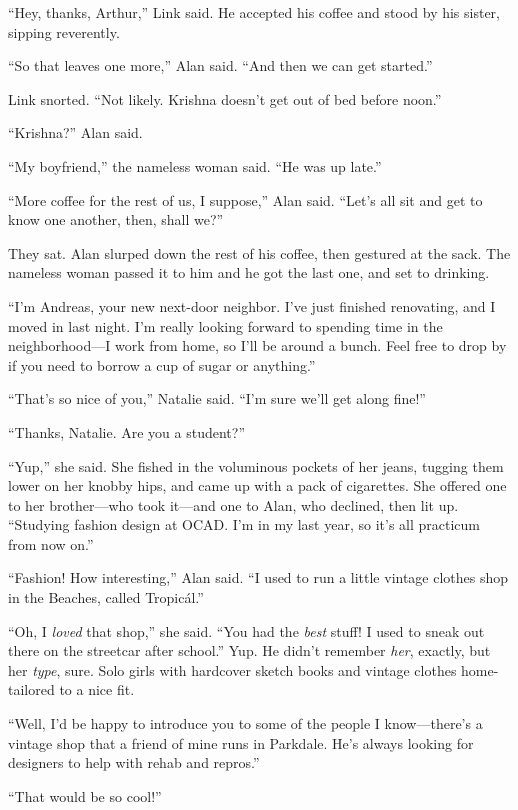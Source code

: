 \documentclass{article}
\begin{document}
``Hey, thanks, Arthur,'' Link said.  He accepted his coffee and stood
by his sister, sipping reverently.

``So that leaves one more,'' Alan said.  ``And then we can get
started.''

Link snorted.  ``Not likely.  Krishna doesn't get out of bed before
noon.''

``Krishna?'' Alan said.

``My boyfriend,'' the nameless woman said.  ``He was up late.''

``More coffee for the rest of us, I suppose,'' Alan said.  ``Let's all
sit and get to know one another, then, shall we?''

They sat.  Alan slurped down the rest of his coffee, then gestured at
the sack.  The nameless woman passed it to him and he got the last
one, and set to drinking.

``I'm Andreas, your new next-door neighbor.  I've just finished
renovating, and I moved in last night.  I'm really looking forward to
spending time in the neighborhood---I work from home, so I'll be
around a bunch.  Feel free to drop by if you need to borrow a cup of
sugar or anything.''

``That's so nice of you,'' Natalie said.  ``I'm sure we'll get along
fine!''

``Thanks, Natalie.  Are you a student?''

``Yup,'' she said.  She fished in the voluminous pockets of her jeans,
tugging them lower on her knobby hips, and came up with a pack of
cigarettes.  She offered one to her brother---who took it---and one to
Alan, who declined, then lit up.  ``Studying fashion design at OCAD. 
I'm in my last year, so it's all practicum from now on.''

``Fashion!  How interesting,'' Alan said.  ``I used to run a little
vintage clothes shop in the Beaches, called Tropic\'{a}l.''

``Oh, I \textit{loved} that shop,'' she said.  ``You had the
\textit{best} stuff!  I used to sneak out there on the streetcar after
school.'' Yup.  He didn't remember \textit{her}, exactly, but her
\textit{type}, sure.  Solo girls with hardcover sketch books and
vintage clothes home-tailored to a nice fit.

``Well, I'd be happy to introduce you to some of the people I
know---there's a vintage shop that a friend of mine runs in Parkdale. 
He's always looking for designers to help with rehab and repros.''

``That would be so cool!''
\end{document}
